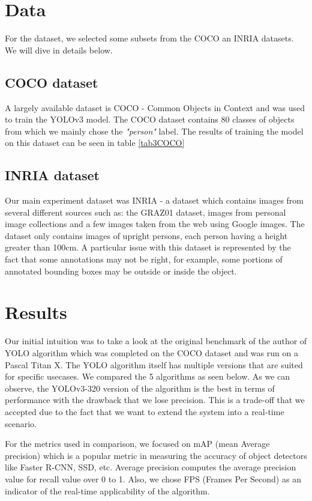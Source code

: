 \documentclass[runningheads,a4paper,11pt]{report}
\begin{document}
\section{Data}
\label{section:data}

For the dataset, we selected some subsets from the COCO an INRIA datasets. We will dive in details below.

\subsection{COCO dataset}
A largely available dataset is COCO \cite{COCODataset} - Common Objects in Context and was used to train the YOLOv3 model. The COCO dataset contains 80 classes of objects from which we mainly chose the \textit{"person"} label. The results of training the model on this dataset can be seen in table \ref{tab3COCO}

\subsection{INRIA dataset}
Our main experiment dataset was INRIA \cite{INRIADataset} - a dataset which contains images from several different sources such as: the GRAZ01 dataset, images from personal image collections and a few images taken from the web using Google images. The dataset only contains images of upright persons, each person having a height greater than 100cm. A particular issue with this dataset is represented by the fact that some annotations may not be right, for example, some portions of annotated bounding boxes may be outside or inside the object.

\section{Results}
\label{section:results}

Our initial intuition was to take a look at the original benchmark of the author of YOLO algorithm which was completed on the COCO dataset and was run on a Pascal Titan X. The YOLO algorithm itself has multiple versions that are suited for specific usecases. We compared the 5 algorithms as seen below. As we can observe, the YOLOv3-320 version of the algorithm is the best in terms of performance with the drawback that we lose precision. This is a trade-off that we accepted due to the fact that we want to extend the system into a real-time scenario.

For the metrics used in comparison, we focused on mAP (mean Average precision) which is a popular metric in measuring the accuracy of object detectors like Faster R-CNN, SSD, etc. Average precision computes the average precision value for recall value over 0 to 1. Also, we chose FPS (Frames Per Second) as an indicator of the real-time applicability of the algorithm.
\end{document}
